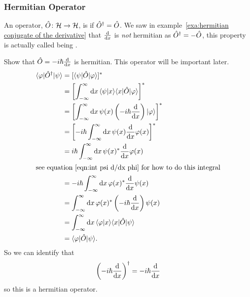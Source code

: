     \subsubsection{Hermitian Operator}
    An operator, \(\hat{O}\colon\mathcal{H}\to\mathcal{H}\), is  if \(\hat{O}^\dagger = \hat{O}\).
    We saw in example~\ref{exa:hermitian conjugate of the derivative} that \(\dv{x}\) is \emph{not} hermitian as \(\hat{O}^\dagger = -\hat{O}\), this property is actually called being .
    \begin{example}\label{exa:momentum operator hermitian}
        Show that \(\hat{O} = -i\hbar\dv{x}\) is hermitian.
        This operator will be important later.
        \begin{align*}
            \langle {\varphi} \vert\hat{O}^\dagger\vert {\psi} \rangle &= [\langle {\psi} \vert\hat{O}\vert {\varphi} \rangle]^*\\
            &= \left[ \int_{-\infty}^{\infty} \dd{x} \langle {\psi} \vert {x} \rangle\langle {x} \vert\hat{O}\vert {\varphi} \rangle \right]^*\\
            &= \left[ \int_{-\infty}^{\infty} \dd{x} \psi(x)\left(-i\hbar\dv{x}\right) \vert {\varphi} \rangle\right]^*\\
            &= \left[ -i\hbar\int_{-\infty}^{\infty} \dd{x} \psi(x)\dv{x} \varphi(x)\right]^*\\
            &= i\hbar \int_{-\infty}^{\infty} \dd{x} \psi(x)^*\dv{x}\varphi(x)\\
            \shortintertext{see equation~\ref{eqn:int psi d/dx phi} for how to do this integral}
            &= -i\hbar \int_{-\infty}^{\infty} \dd{x} \varphi(x)^*\dv{x}\psi(x)\\
            &= \int_{-\infty}^{\infty} \dd{x} \varphi(x)^*\left(-i\hbar\dv{x}\right) \psi(x)\\
            &= \int_{-\infty}^{\infty} \dd{x} \langle {\varphi} \vert {x} \rangle\langle {x} \vert\hat{O}\vert {\psi} \rangle\\
            &= \langle {\varphi} \vert\hat{O}\vert {\psi} \rangle.
        \end{align*}
        So we can identify that
        \[\left(-i\hbar\dv{x}\right)^\dagger = -i\hbar\dv{x}\]
        so this is a hermitian operator.
    \end{example}
